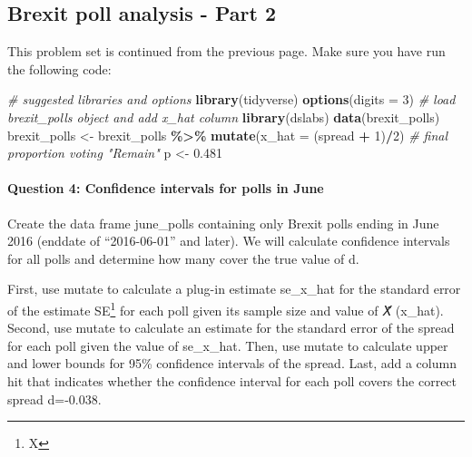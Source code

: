 \documentclass[
]{article}
\newenvironment{Shaded}{\begin{snugshade}}{\end{snugshade}}
\newcommand{\CommentTok}[1]{\textcolor[rgb]{0.56,0.35,0.01}{\textit{#1}}}
\newcommand{\DataTypeTok}[1]{\textcolor[rgb]{0.13,0.29,0.53}{#1}}
\newcommand{\DecValTok}[1]{\textcolor[rgb]{0.00,0.00,0.81}{#1}}
\newcommand{\FloatTok}[1]{\textcolor[rgb]{0.00,0.00,0.81}{#1}}
\newcommand{\KeywordTok}[1]{\textcolor[rgb]{0.13,0.29,0.53}{\textbf{#1}}}
\newcommand{\NormalTok}[1]{#1}
\newcommand{\OperatorTok}[1]{\textcolor[rgb]{0.81,0.36,0.00}{\textbf{#1}}}
\newcommand{\StringTok}[1]{\textcolor[rgb]{0.31,0.60,0.02}{#1}}
\begin{document}
\hypertarget{brexit-poll-analysis---part-2}{%
\subsection{Brexit poll analysis - Part
2}\label{brexit-poll-analysis---part-2}}

This problem set is continued from the previous page. Make sure you have
run the following code:

\begin{Shaded}
\begin{Highlighting}[]
\CommentTok{\# suggested libraries and options}
\KeywordTok{library}\NormalTok{(tidyverse)}
\KeywordTok{options}\NormalTok{(}\DataTypeTok{digits =} \DecValTok{3}\NormalTok{)}
\CommentTok{\# load brexit\_polls object and add x\_hat column}
\KeywordTok{library}\NormalTok{(dslabs)}
\KeywordTok{data}\NormalTok{(brexit\_polls)}
\NormalTok{brexit\_polls \textless{}{-}}\StringTok{ }\NormalTok{brexit\_polls }\OperatorTok{\%\textgreater{}\%}
\StringTok{    }\KeywordTok{mutate}\NormalTok{(}\DataTypeTok{x\_hat =}\NormalTok{ (spread }\OperatorTok{+}\StringTok{ }\DecValTok{1}\NormalTok{)}\OperatorTok{/}\DecValTok{2}\NormalTok{)}
\CommentTok{\# final proportion voting "Remain"}
\NormalTok{p \textless{}{-}}\StringTok{ }\FloatTok{0.481}
\end{Highlighting}
\end{Shaded}

\hypertarget{question-4-confidence-intervals-for-polls-in-june}{%
\paragraph{Question 4: Confidence intervals for polls in
June}\label{question-4-confidence-intervals-for-polls-in-june}}

Create the data frame june\_polls containing only Brexit polls ending in
June 2016 (enddate of ``2016-06-01'' and later). We will calculate
confidence intervals for all polls and determine how many cover the true
value of d.

First, use mutate to calculate a plug-in estimate se\_x\_hat for the
standard error of the estimate SE\footnote{X} for each poll given its
sample size and value of 𝑋̂ (x\_hat). Second, use mutate to calculate an
estimate for the standard error of the spread for each poll given the
value of se\_x\_hat. Then, use mutate to calculate upper and lower
bounds for 95\% confidence intervals of the spread. Last, add a column
hit that indicates whether the confidence interval for each poll covers
the correct spread d=-0.038.
\end{document}
